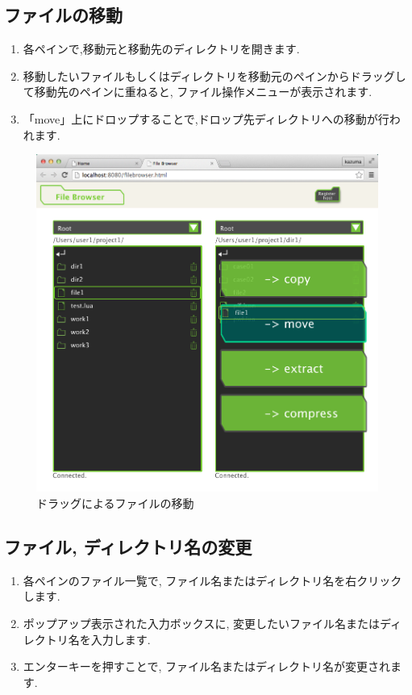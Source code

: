 \documentclass[a4paper,10pt,oneside]{jsbook}
\begin{document}
\subsection{ファイルの移動}
\begin{enumerate}
	\item 各ペインで,移動元と移動先のディレクトリを開きます.
	\item 移動したいファイルもしくはディレクトリを移動元のペインからドラッグして移動先のペインに重ねると,
		  ファイル操作メニューが表示されます.
	\item 「move」上にドロップすることで,ドロップ先ディレクトリへの移動が行われます.
\end{enumerate}
\begin{figure}[htbp]
	\begin{center}
		\includegraphics[width=12.0cm]{image/filebrowser_004.png}
	\end{center}
	\caption{ドラッグによるファイルの移動}
	\label{fig:filebrowser_filemove}
\end{figure}

\subsection{ファイル, ディレクトリ名の変更}
\begin{enumerate}
	\item 各ペインのファイル一覧で, ファイル名またはディレクトリ名を右クリックします.
	\item ポップアップ表示された入力ボックスに, 変更したいファイル名またはディレクトリ名を入力します.
	\item エンターキーを押すことで, ファイル名またはディレクトリ名が変更されます.
\end{enumerate}
\end{document}
